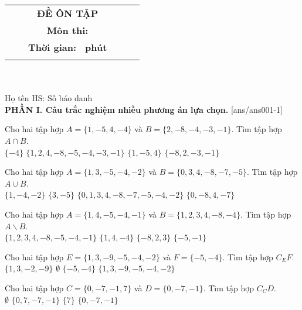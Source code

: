 \documentclass[12pt,a4paper]{article}
\newcommand{\tenso}{}
\newcommand{\tentruong}{}
\newcommand{\tenkythi}{ĐỀ ÔN TẬP}
\newcommand{\tenmonthi}{Môn thi: }
\newcommand{\thoigian}{}
\newcommand{\tieude}[1]{
   \begin{tabular}{cm{3cm}cm{3cm}cm{3cm}}
    {\bf \tenso} & & {\bf \tenkythi} \\
    {\bf \tentruong} & & {\bf \tenmonthi}\\
    && {\bf Thời gian: \bf \thoigian \, phút}\\
    && { \fbox{\bf Mã đề: #1}}
   \end{tabular}\\\\
    
   {Họ tên HS: \dotfill Số báo danh \dotfill}\\
}
\newcommand{\chantrang}[2]{\rfoot{Trang \thepage $-$ Mã đề #2}}
\begin{document}


\tieude{001}
\chantrang{\pageref{LastPage}}{001}
\setcounter{page}{1}
{\bf PHẦN I. Câu trắc nghiệm nhiều phương án lựa chọn.}
\setcounter{ex}{0}
[ans/ans001-1]
\begin{ex}
 Cho hai tập hợp $A=\{{1, -5, 4, -4}\}$ và $B=\{{2, -8, -4, -3, -1}\}$. Tìm tập hợp $A\cap B$. \\ 
\choice
{ \True $\{{-4}\}$ }
   { $\{{1, 2, 4, -8, -5, -4, -3, -1}\}$ }
     { $\{{1, -5, 4}\}$ }
    { $\{{-8, 2, -3, -1}\}$ }
\loigiai{ 
  
 }\end{ex}

\begin{ex}
 Cho hai tập hợp $A=\{{1, 3, -5, -4, -2}\}$ và $B=\{{0, 3, 4, -8, -7, -5}\}$. Tìm tập hợp $A\cup B$. \\ 
\choice
{ $\{{1, -4, -2}\}$ }
   { $\{{3, -5}\}$ }
     { \True $\{{0, 1, 3, 4, -8, -7, -5, -4, -2}\}$ }
    { $\{{0, -8, 4, -7}\}$ }
\loigiai{ 
  
 }\end{ex}

\begin{ex}
 Cho hai tập hợp $A=\{{1, 4, -5, -4, -1}\}$ và $B=\{{1, 2, 3, 4, -8, -4}\}$. Tìm tập hợp $A\backslash B$. \\ 
\choice
{ $\{{1, 2, 3, 4, -8, -5, -4, -1}\}$ }
   { $\{{1, 4, -4}\}$ }
     { $\{{-8, 2, 3}\}$ }
    { \True $\{{-5, -1}\}$ }
\loigiai{ 
  
 }\end{ex}

\begin{ex}
 Cho hai tập hợp $E=\{{1, 3, -9, -5, -4, -2}\}$ và $F=\{{-5, -4}\}$. Tìm tập hợp $C_E F$.\\ 
\choice
{ \True $\{{1, 3, -2, -9}\}$ }
   { $\emptyset$ }
     { $\{{-5, -4}\}$ }
    { $\{{1, 3, -9, -5, -4, -2}\}$ }
\end{ex}

\begin{ex}
 Cho hai tập hợp $C=\{{0, -7, -1, 7}\}$ và $D=\{{0, -7, -1}\}$. Tìm tập hợp $C_C D$.\\ 
\choice
{ $\emptyset$ }
   { $\{{0, 7, -7, -1}\}$ }
     { \True $\{{7}\}$ }
    { $\{{0, -7, -1}\}$ }
\end{ex}
\end{document}
